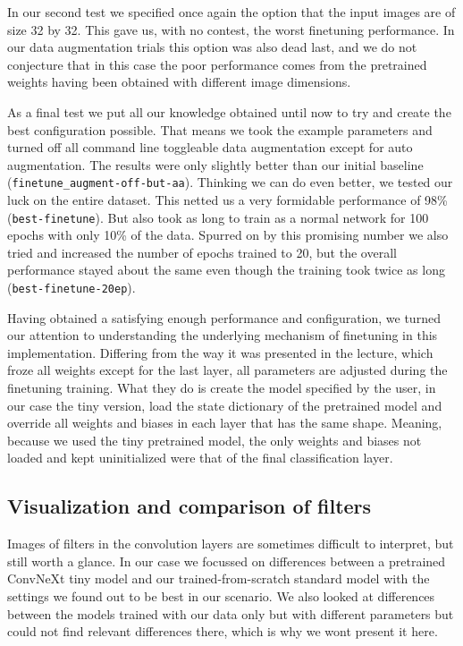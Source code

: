 \documentclass{article}
\begin{document}
In our second test we specified once again the option that the input images are of size 32 by 32.
This gave us, with no contest, the worst finetuning performance.
In our data augmentation trials this option was also dead last, and we do not conjecture that in this case the poor performance comes from the pretrained weights having been obtained with different image dimensions.

As a final test we put all our knowledge obtained until now to try and create the best configuration possible.
That means we took the example parameters and turned off all command line toggleable data augmentation except for auto augmentation.
The results were only slightly better than our initial baseline (\texttt{finetune\_augment-off-but-aa}).
Thinking we can do even better, we tested our luck on the entire dataset.
This netted us a very formidable performance of 98\% (\texttt{best-finetune}).
But also took as long to train as a normal network for 100 epochs with only 10\% of the data.
Spurred on by this promising number we also tried and increased the number of epochs trained to 20, but the overall performance stayed about the same even though the training took twice as long (\texttt{best-finetune-20ep}).

Having obtained a satisfying enough performance and configuration, we turned our attention to understanding the underlying mechanism of finetuning in this implementation.
Differing from the way it was presented in the lecture, which froze all weights except for the last layer, all parameters are adjusted during the finetuning training.
What they do is create the model specified by the user, in our case the tiny version, load the state dictionary of the pretrained model and override all weights and biases in each layer that has the same shape.
Meaning, because we used the tiny pretrained model, the only weights and biases not loaded and kept uninitialized were that of the final classification layer.


\subsection{Visualization and comparison of filters}\label{subsec:filter-images}
Images of filters in the convolution layers are sometimes difficult to interpret, but still worth a glance. In our case we focussed on differences between a pretrained ConvNeXt tiny model and our trained-from-scratch standard model with the settings we found out to be best in our scenario. We also looked at differences between the models trained with our data only but with different parameters but could not find relevant differences there, which is why we wont present it here.
\end{document}
